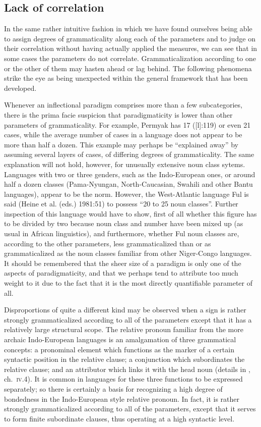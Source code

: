 \subsection{Lack of correlation}

In the same rather intuitive fashion in which we have found ourselves being able to assign degrees of grammaticality along each of the parameters and to judge on their correlation without having actually applied the measures, we can see that in some cases the parameters do not correlate. Grammaticalization according to one or the other of them may hasten ahead or lag behind. The following phenomena strike the eye as being unexpected within the general framework that has been developed.

Whenever an inflectional paradigm comprises more than a few subcategories, there is the prima facie suspicion that paradigmaticity is lower than other parameters of grammaticality. For example, Permyak has 17 (\citet{Comrie1981}[l]:119) or even 21 \citep[238]{Austerlitz1980} cases, while the average number of cases in a language does not appear to be more than half a dozen. This example may perhaps be “explained away” by assuming several layers of cases, of differing degrees of grammaticality. The same explanation will not hold, however, for unusually extensive noun class sytems. Languages with two or three genders, such as the Indo-European ones, or around half a dozen classes (Pama-Nyungan, North-Caucasian, Swahili and other Bantu languages), appear to be the norm. However, the West-Atlantic language Ful is said (Heine et al. (eds.) 1981:51) to possess “20 to 25 noun classes”. Further inspection of this language would have to show, first of all whether this figure has to be divided by two because noun class and number have been mixed up (as usual in African linguistics), and furthermore, whether Ful noun classes are, according to the other parameters, less grammaticalized than or as grammaticalized as the noun classes familiar from other Niger-Congo languages. It should be remembered that the sheer size of a paradigm is only one of the aspects of paradigmaticity, and that we perhaps tend to attribute too much weight to it due to the fact that it is the most directly quantifiable parameter of all.

Disproportions of quite a different kind may be observed when a sign is rather strongly grammaticalized according to all of the parameters except that it has a relatively large structural scope. The relative pronoun familiar from the more archaic Indo-European languages is an amalgamation of three grammatical concepts: a pronominal element which functions as the marker of a certain syntactic position in the relative clause; a conjunction which subordinates the relative clause; and an attributor which links it with the head noun (details in \citet{Lehmann1984}, ch.~\textsc{iv}.4). It is common in languages for these three functions to be expressed separately; so there is certainly a basis for recognizing a high degree of bondedness in the Indo-European style relative pronoun. In fact, it is rather strongly grammaticalized according to all of the parameters, except that it serves to form finite subordinate clauses, thus operating at a high syntactic level.

